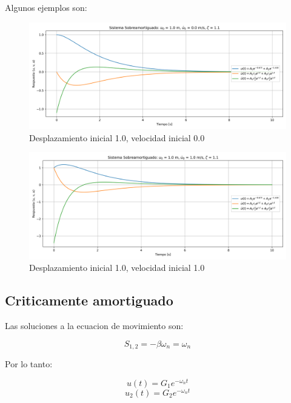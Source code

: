 \documentclass{article}  %
\begin{document}
Algunos ejemplos son:

\begin{figure}[H]
    \centering
    \includegraphics[width=1\textwidth]{GRAFICOS/sis_sobreamortiguado_u0_1.0_v0_0.0_zeta_1.1.png}
    \caption{Desplazamiento inicial 1.0, velocidad inicial 0.0}
    \label{fig:ejemplo1}
\end{figure}

\begin{figure}[H]
    \centering
    \includegraphics[width=1\textwidth]{GRAFICOS/sis_sobreamortiguado_u0_1.0_v0_1.0_zeta_1.1.png}
    \caption{Desplazamiento inicial 1.0, velocidad inicial 1.0}
    \label{fig:ejemplo1}
\end{figure}

\subsection{Criticamente amortiguado}

Las soluciones a la ecuacion de movimiento son:

\begin{equation}
   S_{1,2} = -\beta \omega_n = \omega_n
\end{equation}

Por lo tanto:

\begin{equation}
    u(t) = G_1e^{-\omega_n t} 
\end{equation}
\begin{equation}
    u_2(t) = G_2e^{-\omega_n t}
\end{equation}
\end{document}

